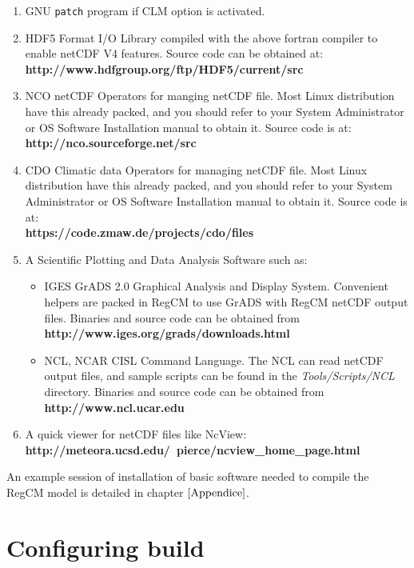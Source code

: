 \begin{enumerate}
\item GNU \verb=patch= program if CLM option is activated.
\item HDF5 Format I/O Library compiled with the above fortran compiler to
enable netCDF V4 features. Source code can be obtained at: \\
{\bf http://www.hdfgroup.org/ftp/HDF5/current/src}
\item NCO netCDF Operators for manging netCDF file. Most Linux distribution
have this already packed, and you should refer to your System Administrator or
OS Software Installation manual to obtain it. Source code is at: \\
{\bf http://nco.sourceforge.net/src}
\item CDO Climatic data Operators for managing netCDF file. Most Linux
distribution have this already packed, and you should refer to your System
Administrator or OS Software Installation manual to obtain it.
Source code is at: \\
{\bf https://code.zmaw.de/projects/cdo/files}
\item A Scientific Plotting and Data Analysis Software such as:
\begin{itemize}
\item IGES GrADS 2.0 Graphical Analysis and Display System. Convenient helpers
are packed in RegCM to use GrADS with RegCM netCDF output files.
Binaries and source code can be obtained from \\
{\bf http://www.iges.org/grads/downloads.html}
\item NCL, NCAR CISL Command Language. The NCL can read netCDF output files, and
sample scripts can be found in the {\em Tools/Scripts/NCL} directory.
Binaries and source code can be obtained from \\
{\bf http://www.ncl.ucar.edu}
\end{itemize}
\item A quick viewer for netCDF files like NcView: \\
{\bf http://meteora.ucsd.edu/~pierce/ncview\_home\_page.html}
\end{enumerate}

An example session of installation of basic software needed to compile the
RegCM model is detailed in chapter $\ref{Appendice}$.

\section{Configuring build}

